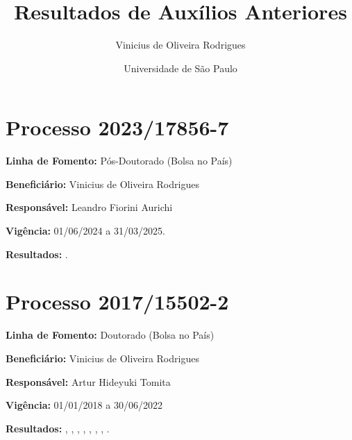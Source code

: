 \documentclass[12pt]{article}
\author{Vinicius de Oliveira Rodrigues}
\date{Universidade de São Paulo}
\title{Resultados de Auxílios Anteriores}
\theoremstyle{definition}
\begin{document}
\maketitle

\section{Processo 2023/17856-7}
\textbf{Linha de Fomento:} Pós-Doutorado (Bolsa no País)

\textbf{Beneficiário:} Vinicius de Oliveira Rodrigues

\textbf{Responsável:} Leandro Fiorini Aurichi

\textbf{Vigência:} 	01/06/2024 a 31/03/2025.

\textbf{Resultados:} \cite{almontashery2024semiproximalspacesnormality}.

\section{Processo 2017/15502-2}
\textbf{Linha de Fomento:} Doutorado (Bolsa no País)

\textbf{Beneficiário:} Vinicius de Oliveira Rodrigues

\textbf{Responsável:} Artur Hideyuki Tomita

\textbf{Vigência:} 01/01/2018 a 30/06/2022

\textbf{Resultados:} \cite{ortiz2018small}, \cite{rodrigues2019small}, \cite{guzman2022maximal}, \cite{rodrigues2021almost}, \cite{rodrigues2023special}, \cite{bellini2019countably}, \cite{bellini2021algebraic}, \cite{bellini2023countably}.



\end{document}
